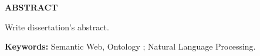 \begin{center}
    \textbf{ABSTRACT}
    \vspace{60pt}
\end{center}

Write dissertation's abstract.
\vspace{20pt}

\textbf{Keywords:} Semantic Web, Ontology ; Natural Language Processing.
